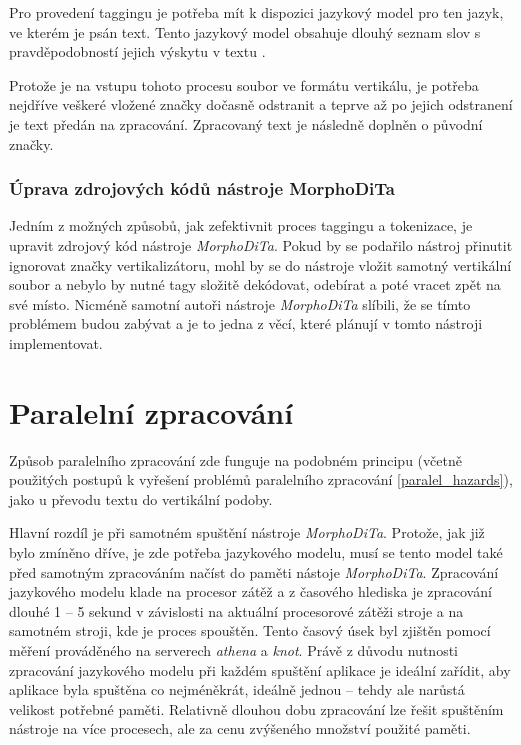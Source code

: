 Pro provedení taggingu je potřeba mít k dispozici jazykový model pro ten jazyk, ve kterém je psán text. Tento jazykový model obsahuje
dlouhý seznam slov s pravděpodobností jejich výskytu v textu \cite{LANGMODEL}.

Protože je na vstupu tohoto procesu soubor ve formátu vertikálu, je potřeba nejdříve veškeré vložené značky dočasně odstranit a teprve
až po jejich odstranení je text předán na zpracování. Zpracovaný text je následně doplněn o původní značky.

\subsubsection{Úprava zdrojových kódů nástroje MorphoDiTa}
Jedním z možných způsobů, jak zefektivnit proces taggingu a tokenizace, je upravit zdrojový kód
nástroje \textit{MorphoDiTa}. Pokud by se podařilo nástroj přinutit ignorovat značky vertikalizátoru,
mohl by se do nástroje vložit samotný vertikální soubor a nebylo by nutné tagy složitě dekódovat,
odebírat a poté vracet zpět na své místo. Nicméně samotní autoři nástroje \textit{MorphoDiTa} slíbili,
že se tímto problémem budou zabývat a je to jedna z věcí, které plánují v tomto nástroji
implementovat.

\section{Paralelní zpracování}
Způsob paralelního zpracování zde funguje na podobném principu (včetně použitých postupů k vyřešení problémů
paralelního zpracování \ref{paralel_hazards}), jako u převodu textu do vertikální podoby.

Hlavní rozdíl je při samotném spuštění nástroje \textit{MorphoDiTa}. Protože, jak již bylo zmíněno dříve, je zde potřeba
jazykového modelu, musí se tento model také před samotným zpracováním načíst do paměti nástoje \textit{MorphoDiTa}.
Zpracování jazykového modelu klade na procesor zátěž a z časového hlediska je zpracování dlouhé 1 -- 5 sekund v závislosti
na aktuální procesorové zátěži stroje a na samotném stroji, kde je proces spouštěn. Tento časový úsek
byl zjištěn pomocí měření prováděného na serverech \textit{athena} a \textit{knot}. Právě z důvodu nutnosti
zpracování jazykového modelu při každém spuštění aplikace je ideální zařídit, aby aplikace
byla spuštěna co nejméněkrát, ideálně jednou -- tehdy ale narůstá velikost potřebné paměti. Relativně dlouhou dobu zpracování
lze řešit spuštěním nástroje na více procesech, ale za cenu zvýšeného množství použité paměti.

